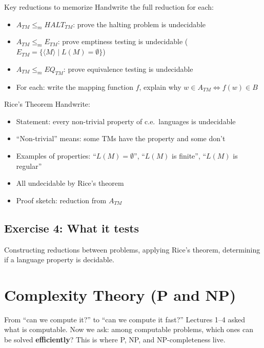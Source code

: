 \documentclass[11pt,a4paper]{article}
\begin{document}
\begin{writebox}{Key reductions to memorize}
Handwrite the full reduction for each:
\begin{itemize}[nosep]
\item $A_{TM} \leq_m HALT_{TM}$: prove the halting problem is undecidable
\item $A_{TM} \leq_m E_{TM}$: prove emptiness testing is undecidable ($E_{TM} = \{\langle M \rangle \mid L(M) = \emptyset\}$)
\item $A_{TM} \leq_m EQ_{TM}$: prove equivalence testing is undecidable
\item For each: write the mapping function $f$, explain why $w \in A_{TM} \iff f(w) \in B$
\end{itemize}
\end{writebox}

\begin{writebox}{Rice's Theorem}
Handwrite:
\begin{itemize}[nosep]
\item Statement: every non-trivial property of c.e.\ languages is undecidable
\item ``Non-trivial'' means: some TMs have the property and some don't
\item Examples of properties: ``$L(M) = \emptyset$'', ``$L(M)$ is finite'', ``$L(M)$ is regular''
\item All undecidable by Rice's theorem
\item Proof sketch: reduction from $A_{TM}$
\end{itemize}
\end{writebox}

\subsection*{Exercise 4: What it tests}
Constructing reductions between problems, applying Rice's theorem, determining if a language property is decidable.

\section{Complexity Theory (P and NP)}

\begin{whybox}{From ``can we compute it?'' to ``can we compute it fast?''}
Lectures 1--4 asked what is computable. Now we ask: among computable problems, which ones can be solved \textbf{efficiently}? This is where P, NP, and NP-completeness live.
\end{whybox}
\end{document}
